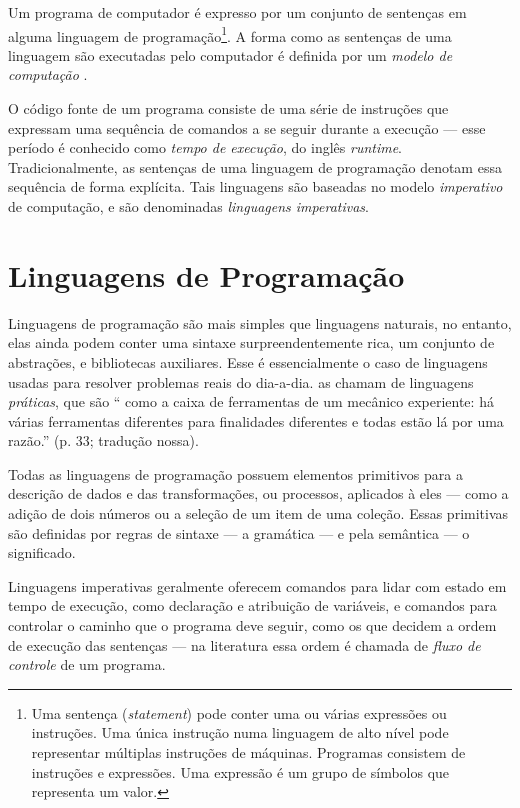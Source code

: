 Um programa de computador é expresso por um conjunto de sentenças em alguma
linguagem de programação\footnote{Uma sentença (\emph{statement}) pode conter uma ou várias expressões ou instruções.
Uma única instrução numa linguagem de alto nível pode representar múltiplas
instruções de máquinas.
Programas consistem de instruções e expressões.
Uma expressão é um grupo de símbolos que representa um valor.}.
A forma como as sentenças de uma linguagem são executadas pelo computador é
definida por um \emph{modelo de computação} \cite{roy2004}.

O código fonte de um programa consiste de uma série de instruções que expressam
uma sequência de comandos a se seguir durante a execução — esse período é
conhecido como \emph{tempo de execução}, do inglês \emph{runtime}.
Tradicionalmente, as sentenças de uma linguagem de programação denotam essa
sequência de forma explícita.
Tais linguagens são baseadas no modelo \emph{imperativo} de computação, e são
denominadas \emph{linguagens imperativas}.
\section{Linguagens de Programação}
\label{sec:orgfaa6327}
\label{sec:langs}

Linguagens de programação são mais simples que linguagens naturais, no
entanto, elas ainda podem conter uma sintaxe surpreendentemente rica, um
conjunto de abstrações, e bibliotecas auxiliares.
Esse é essencialmente o caso de linguagens usadas para resolver problemas
reais do dia-a-dia.
\textcite{roy2004} as chamam de linguagens \emph{práticas}, que são “\textelp{}
como a caixa de ferramentas de um mecânico experiente: há várias ferramentas
diferentes para finalidades diferentes e todas estão lá por uma razão.” (p.
33; tradução nossa).

Todas as linguagens de programação possuem elementos primitivos para a
descrição de dados e das transformações, ou processos, aplicados à eles —
como a adição de dois números ou a seleção de um item de uma coleção.
Essas primitivas são definidas por regras de sintaxe — a gramática — e pela
semântica — o significado.

Linguagens imperativas geralmente oferecem comandos para lidar com estado em
tempo de execução, como declaração e atribuição de variáveis, e comandos
para controlar o caminho que o programa deve seguir, como os que decidem a
ordem de execução das sentenças — na literatura essa ordem é chamada de
\emph{fluxo de controle} de um programa.

